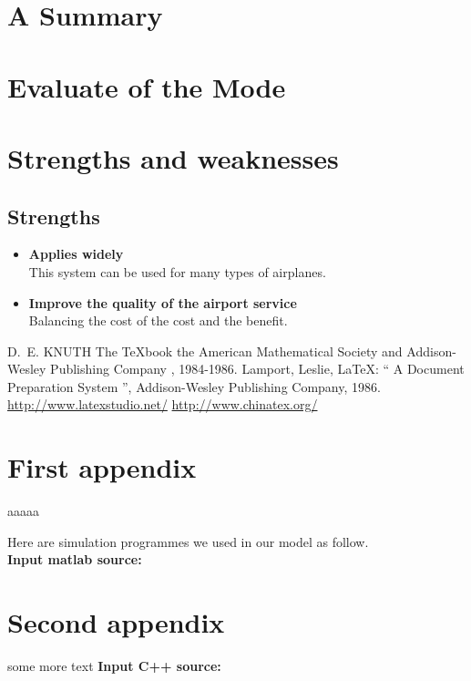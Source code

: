 \documentclass{mcmthesis}
\begin{document}
\section{A Summary}

\section{Evaluate of the Mode}

\section{Strengths and weaknesses}


\subsection{Strengths}
\begin{itemize}
\item \textbf{Applies widely}\\
This system can be used for many types of airplanes.
\item \textbf{Improve the quality of the airport service}\\
Balancing the cost of the cost and the benefit. 
\end{itemize}

\begin{thebibliography}{99}
 D.~E. KNUTH   The \TeX{}book  the American
Mathematical Society and Addison-Wesley
Publishing Company , 1984-1986.
Lamport, Leslie,  \LaTeX{}: `` A Document Preparation System '',
Addison-Wesley Publishing Company, 1986.
\url{http://www.latexstudio.net/}
\url{http://www.chinatex.org/}
\end{thebibliography}

\begin{appendices}

\section{First appendix}

aaaaa

Here are simulation programmes we used in our model as follow.\\

\textbf{\textcolor[rgb]{0.98,0.00,0.00}{Input matlab source:}}


\section{Second appendix}

some more text \textcolor[rgb]{0.98,0.00,0.00}{\textbf{Input C++ source:}}


\end{appendices}
\end{document}
